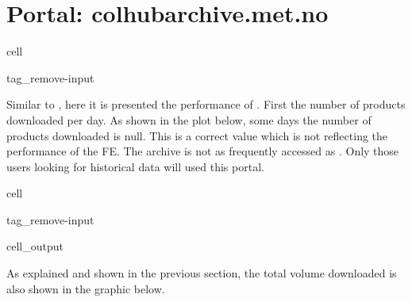 \documentclass[letterpaper,10pt,english]{jupyterBook}
\begin{document}
\section{Portal: colhub\sphinxhyphen{}archive.met.no}
\label{\detokenize{user_downloads:portal-colhub-archive-met-no}}
\begin{sphinxuseclass}{cell}
\begin{sphinxuseclass}{tag_remove-input}
\end{sphinxuseclass}
\end{sphinxuseclass}
\sphinxAtStartPar
Similar to , here it is presented the performance of . First the number of products downloaded per day. As shown in the plot below, some days the number of products downloaded is null. This is a correct value which is not reflecting the performance of the FE. The archive is not as frequently accessed as . Only those users looking for historical data will used this portal.

\begin{sphinxuseclass}{cell}
\begin{sphinxuseclass}{tag_remove-input}\begin{sphinxVerbatimOutput}

\begin{sphinxuseclass}{cell_output}
\noindent{}

\end{sphinxuseclass}\end{sphinxVerbatimOutput}

\end{sphinxuseclass}
\end{sphinxuseclass}
\sphinxAtStartPar
As explained and shown in the previous section, the total volume downloaded is also shown in the graphic below.
\end{document}
